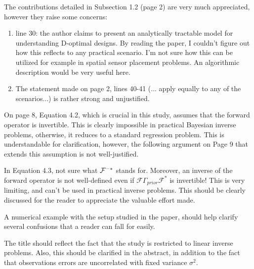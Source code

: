 \documentclass{amsart}
\begin{document}

The contributions detailed in Subsection 1.2 (page 2) are very much
appreciated, however they raise some concerns:

\begin{enumerate}
\item line 30: the author claims to present an analytically tractable
  model for understanding D-optimal designs. By reading the paper, I
  couldn't figure out how this reflects to any practical scenario. I'm
  not sure how this can be utilized for example in spatial sensor
  placement problems. An algorithmic description would be very useful
  here.


\item The statement made on page 2, lines 40-41 (... apply equally to
  any of the scenarios...) is rather strong and unjustified.
\end{enumerate}

On page 8, Equation 4.2, which is crucial in this study, assumes that
the forward operator is invertible. This is clearly impossible in
practical Bayesian inverse problems, otherwise, it reduces to a
standard regression problem. This is understandable for clarification,
however, the following argument on Page 9 that extends this assumption
is not well-justified. 


In Equation 4.3, not sure what $\mathcal{F}^{-*}$ stands for. Moreover, an
inverse of the forward operator is not well-defined even if
$\mathcal{F}\Gamma_{prior}\mathcal{F}^*$ is invertible! This is very
limiting, and can't be used in practical inverse problems. This should
be clearly discussed for the reader to appreciate the valuable effort
made. 


A numerical example with the setup studied in the paper, should help
clarify several confusions that a reader can fall for easily.


The title should reflect the fact that the study is restricted to
linear inverse problems. Also, this should be clarified in the
abstract, in addition to the fact that observations errors are
uncorrelated with fixed variance $\sigma^2$. 
\end{document}
